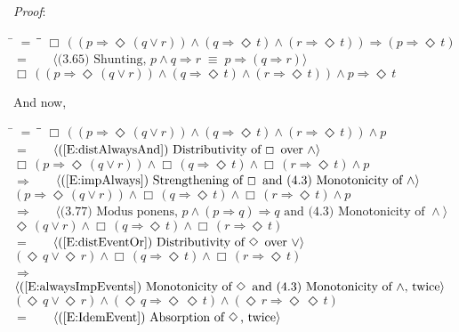 \documentclass[12pt, fleqn, leqno]{article}
\newcommand{\lgap}{2pt}                             %
\newcommand{\mymathindent}{24pt}                    %
\newcommand{\equivs}{\ensuremath{\;\equiv\;}}       %
\newcommand{\impl}{\ensuremath{\Rightarrow}}        %
\newcommand{\Event}{\Diamond\,}
\newcommand{\Always}{\Box\,}
\newcommand{\myqedtab}{\hspace{384pt}}              %
\newcommand{\Gll} {\langle}                         %
\newcommand{\Ggg} {\rangle}                         %
\newcommand{\Hint}[1]     {\ \ \ $\Gll              \mbox{#1} \Ggg$ }   %
\begin{document}
\emph{Proof}:
\begin{tabbing}
\hspace{\mymathindent} \= $= \;$ \= \myqedtab \= \kill
  \> \>   $\Always ((p \impl \Event (q \lor r)) \land (q \impl \Event t) \land (r \impl \Event t)) \impl (p \impl \Event t)$\\[\lgap]
  \> $=$  \>  \Hint{(3.65) Shunting, $p\land q\impl r\equivs p\impl (q\impl r)$}\\[\lgap]
  \> \>   $\Always ((p \impl \Event (q \lor r)) \land (q \impl \Event t) \land (r \impl \Event t)) \land p \impl \Event t$
\end{tabbing}
And now,
\begin{tabbing}
\hspace{\mymathindent} \= $= \;$ \= \myqedtab \= \kill
  \> \>   $\Always ((p \impl \Event (q \lor r)) \land (q \impl \Event t) \land (r \impl \Event t)) \land p $\\[\lgap]
  \> $=$  \>  \Hint{(\ref{E:distAlwaysAnd}) Distributivity of $\Always$ over $\land$}\\[\lgap]
   \> \>   $\Always (p \impl \Event (q \lor r)) \land \Always (q \impl \Event t) \land \Always (r \impl \Event t) \land p $\\[\lgap]
    \> $\impl$  \>  \Hint{(\ref{E:impAlways}) Strengthening of $\Always$ and (4.3) Monotonicity of $\land$}\\[\lgap]
     \> \>   $(p \impl \Event (q \lor r)) \land \Always (q \impl \Event t) \land \Always (r \impl \Event t) \land p $\\[\lgap]
     \> $\impl$  \>  \Hint{(3.77) Modus ponens, $p\land (p\impl q)\impl q$ and (4.3) Monotonicity of $\land$}\\[\lgap]
 \> \>   $\Event (q \lor r) \land \Always (q \impl \Event t) \land \Always (r \impl \Event t)$\\[\lgap]
 \> $=$  \>  \Hint{(\ref{E:distEventOr}) Distributivity of $\Event$ over $\lor$}\\[\lgap]
 \> \>   $(\Event q \lor \Event r) \land \Always (q \impl \Event t) \land \Always (r \impl \Event t)$\\[\lgap]
 \> $\impl$  \>  \Hint{(\ref{E:alwaysImpEvents}) Monotonicity of $\Event$ and (4.3) Monotonicity of $\land$, twice}\\[\lgap]
 \> \>   $(\Event q \lor \Event r) \land (\Event q \impl \Event\Event t) \land (\Event r \impl \Event\Event t)$\\[\lgap]
 \> $=$  \>  \Hint{(\ref{E:IdemEvent}) Absorption of $\Event$, twice}\\[\lgap]

\end{tabbing}
\end{document}
